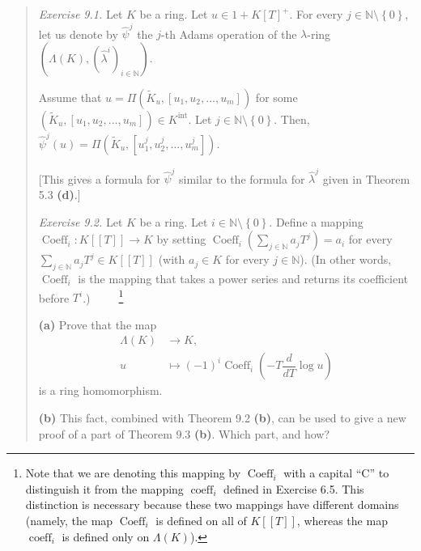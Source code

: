 \documentclass[numbers=enddot,12pt,final,onecolumn,notitlepage]{scrartcl}%
\begin{document}
\begin{quotation}
\textit{Exercise 9.1.} Let $K$ be a ring. Let $u\in1+K\left[  T\right]  ^{+}$.
For every $j\in\mathbb{N}\setminus\left\{  0\right\}  $, let us denote by
$\widehat{\psi}^{j}$ the $j$-th Adams operation of the $\lambda$-ring $\left(
\Lambda\left(  K\right)  ,\left(  \widehat{\lambda}^{i}\right)  _{i\in
\mathbb{N}}\right)  $.

Assume that $u=\Pi\left(  \widetilde{K}_{u},\left[  u_{1},u_{2},...,u_{m}%
\right]  \right)  $ for some $\left(  \widetilde{K}_{u},\left[  u_{1}%
,u_{2},...,u_{m}\right]  \right)  \in K^{\operatorname*{int}}$. Let
$j\in\mathbb{N}\setminus\left\{  0\right\}  $. Then, $\widehat{\psi}%
^{j}\left(  u\right)  =\Pi\left(  \widetilde{K}_{u},\left[  u_{1}^{j}%
,u_{2}^{j},...,u_{m}^{j}\right]  \right)  $.

[This gives a formula for $\widehat{\psi}^{j}$ similar to the formula for
$\widehat{\lambda}^{j}$ given in Theorem 5.3 \textbf{(d)}.]

\textit{Exercise 9.2.} Let $K$ be a ring. Let $i\in\mathbb{N}\setminus\left\{
0\right\}  $. Define a mapping $\operatorname*{Coeff}\nolimits_{i}:K\left[
\left[  T\right]  \right]  \rightarrow K$ by setting $\operatorname*{Coeff}%
\nolimits_{i}\left(  \sum\limits_{j\in\mathbb{N}}a_{j}T^{j}\right)  =a_{i}$
for every $\sum\limits_{j\in\mathbb{N}}a_{j}T^{j}\in K\left[  \left[
T\right]  \right]  $ (with $a_{j}\in K$ for every $j\in\mathbb{N}$). (In other
words, $\operatorname*{Coeff}\nolimits_{i}$ is the mapping that takes a power
series and returns its coefficient before $T^{i}$.)\ \ \ \ \ \footnote{Note
that we are denoting this mapping by $\operatorname*{Coeff}\nolimits_{i}$ with
a capital ``C'' to distinguish it from the mapping $\operatorname*{coeff}%
\nolimits_{i}$ defined in Exercise 6.5. This distinction is necessary because
these two mappings have different domains (namely, the map
$\operatorname*{Coeff}\nolimits_{i}$ is defined on all of $K\left[  \left[
T\right]  \right]  $, whereas the map $\operatorname*{coeff}\nolimits_{i}$ is
defined only on $\Lambda\left(  K\right)  $).}

\textbf{(a)} Prove that the map%
\begin{align*}
\Lambda\left(  K\right)   &  \rightarrow K,\\
u  &  \mapsto\left(  -1\right)  ^{i}\operatorname*{Coeff}\nolimits_{i}\left(
-T\dfrac{d}{dT}\log u\right)
\end{align*}
is a ring homomorphism.

\textbf{(b)} This fact, combined with Theorem 9.2 \textbf{(b)}, can be used to
give a new proof of a part of Theorem 9.3 \textbf{(b)}. Which part, and how?


\end{quotation}
\end{document}

